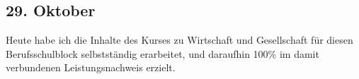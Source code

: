 \subsection{29. Oktober}
Heute habe ich die Inhalte des Kurses zu Wirtschaft und Gesellschaft für diesen Berufsschulblock selbstständig erarbeitet, und daraufhin 100\% im damit verbundenen Leistungsnachweis erzielt.